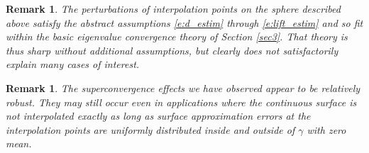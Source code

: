 \documentclass{siamart0516}
\newtheorem{remark}[theorem]{Remark}
\numberwithin{equation}{section}
\numberwithin{theorem}{section}
\numberwithin{figure}{section}
\begin{document}
\begin{remark}
The perturbations of interpolation points on the sphere described above satisfy the abstract assumptions \eqref{e:d_estim} through \eqref{e:lift_estim} and so fit within the basic eigenvalue convergence theory of Section \ref{sec3}.  That theory is thus sharp without additional assumptions, but clearly does not satisfactorily explain many cases of interest.  
\end{remark}
\begin{remark}
The superconvergence effects we have observed appear to be relatively robust.  They may still occur even in applications where the continuous surface is not interpolated exactly as long as surface approximation errors at the interpolation points are uniformly distributed inside and outside of $\gamma$ with zero mean.  
\end{remark}




\end{document}
